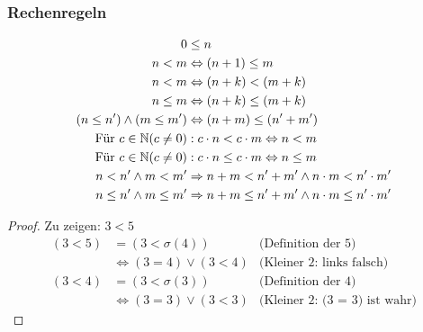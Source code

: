 \subsubsection{Rechenregeln}
\begin{align*}
  0 & \leq n\\
  n < m& \Leftrightarrow (n + 1) \leq m\\
  n < m& \Leftrightarrow (n + k) < (m + k)\\
  n \leq m& \Leftrightarrow (n + k) \leq (m + k)\\
  (n \leq n') \wedge (m \leq m')& \Leftrightarrow (n + m) \leq (n' + m')\\
  \mbox{Für }c \in \mathbb{N} (c \neq 0)&: c\cdot n < c \cdot m \Leftrightarrow n < m\\
  \mbox{Für }c \in \mathbb{N} (c \neq 0)&: c\cdot n \leq c \cdot m \Leftrightarrow n \leq m\\
  n < n' \wedge m < m' &\Rightarrow n + m < n' + m' \wedge n \cdot m < n' \cdot m'\\
  n \leq n' \wedge m \leq m' &\Rightarrow n + m \leq n' + m' \wedge n \cdot m \leq n' \cdot m'
\end{align*}
  

\begin{proof}
Zu zeigen: $3 < 5$
	\begin{align*}
		(3 < 5) & = (3 < \sigma(4))				& \mbox{(Definition der 5)}\\
		& \Leftrightarrow (3 = 4) \vee (3 < 4)	& \mbox{(Kleiner 2: links falsch)}\\
		(3 < 4) & = (3 < \sigma(3))				& \mbox{(Definition der 4)}\\
		& \Leftrightarrow (3 = 3) \vee (3 < 3)	& \mbox{(Kleiner 2: (3 = 3) ist wahr)}
	\end{align*}
	\qedhere
\end{proof}

